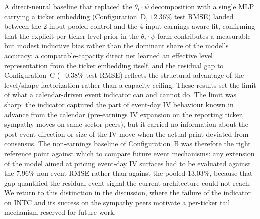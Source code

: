 A direct-neural baseline that replaced the $\theta_i \cdot \psi$ decomposition with a single MLP carrying a ticker embedding (Configuration~D, $12.36\%$ test RMSE) landed between the 2-input pooled control and the 4-input earnings-aware fit, confirming that the explicit per-ticker level prior in the $\theta_i \cdot \psi$ form contributes a measurable but modest inductive bias rather than the dominant share of the model's accuracy: a comparable-capacity direct net learned an effective level representation from the ticker embedding itself, and the residual gap to Configuration~C ($-0.38\%$ test RMSE) reflects the structural advantage of the level/shape factorization rather than a capacity ceiling. These results set the limit of what a calendar-driven event indicator can and cannot do. The limit was sharp: the indicator captured the part of event-day IV behaviour known in advance from the calendar (pre-earnings IV expansion on the reporting ticker, sympathy moves on same-sector peers), but it carried no information about the post-event direction or size of the IV move when the actual print deviated from consensus. The non-earnings baseline of Configuration~B was therefore the right reference point against which to compare future event mechanisms: any extension of the model aimed at pricing event-day IV surfaces had to be evaluated against the $7.96\%$ non-event RMSE rather than against the pooled $13.03\%$, because that gap quantified the residual event signal the current architecture could not reach. We return to this distinction in the discussion, where the failure of the indicator on INTC and its success on the sympathy peers motivate a per-ticker tail mechanism reserved for future work.
